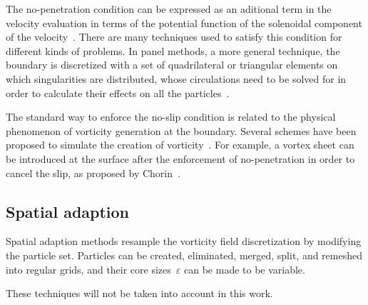 The no-penetration condition can be expressed as an aditional term
in the velocity evaluation in terms of the potential function
of the solenoidal component of the velocity~\cite[\S4.2]{cottet00}.
There are many techniques used to satisfy this condition
for different kinds of problems.
In panel methods, a more general technique,
the boundary is discretized
with a set of quadrilateral or triangular elements
on which singularities are distributed,
whose circulations need to be solved for
in order to calculate their effects on all the particles~\cite[\S2.4]{rama09}.

The standard way to enforce the no-slip condition
is related to the physical phenomenon of vorticity generation at the boundary.
Several schemes have been proposed
to simulate the creation of vorticity~\cite[\S6]{cottet00}.
For example, a vortex sheet can be introduced at the surface
after the enforcement of no-penetration in order to cancel the slip,
as proposed by Chorin~\cite[\S6.3.2]{cottet00}.


\subsection{Spatial adaption}
\label{ssec:sa}

Spatial adaption methods resample the vorticity field discretization
by modifying the particle set.
Particles can be created, eliminated, merged, split,
and remeshed into regular grids,
and their core sizes~\(ε\) can be made to be variable.

These techniques will not be taken into account in this work.



